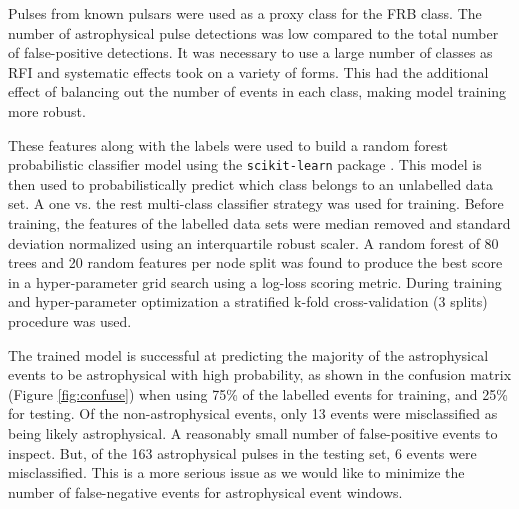 \documentclass[a4paper,fleqn,usenatbib]{mnras}
\begin{document}
Pulses from known pulsars were used as a proxy class for the FRB class. The
number of astrophysical pulse detections was low compared to the total number of
false-positive detections. It was necessary to use a large number of classes
as RFI and systematic effects took on a variety of forms.  This had the
additional effect of balancing out the number of events in each class, making
model training more robust.

These features along with the labels were used to build a random forest
probabilistic classifier model \citep{Ho:1995:RDF:844379.844681,Breiman2001}
using the \texttt{scikit-learn} package \citep{scikit-learn}.
This model is then used to probabilistically predict which class belongs to an
unlabelled data set. A one vs. the rest multi-class classifier strategy was used
for training. Before training, the features of the labelled data sets were
median removed and standard deviation normalized using an interquartile robust
scaler.  A random forest of 80 trees and 20 random features per node split was
found to produce the best score in a hyper-parameter grid search using a
log-loss scoring metric. During training and hyper-parameter optimization a
stratified k-fold cross-validation (3 splits)
\citep{Kohavi:1995:SCB:1643031.1643047} procedure was used.

The trained model is successful at predicting the majority of the astrophysical
events to be astrophysical with high probability, as shown in the confusion
matrix (Figure \ref{fig:confuse}) when using 75\% of the labelled events for
training, and 25\% for testing. Of the non-astrophysical events, only 13 events
were misclassified as being likely astrophysical. A reasonably small number of
false-positive events to inspect. But, of the 163 astrophysical pulses in the
testing set, 6 events were misclassified. This is a more serious issue as we
would like to minimize the number of false-negative events for astrophysical
event windows.
\end{document}
